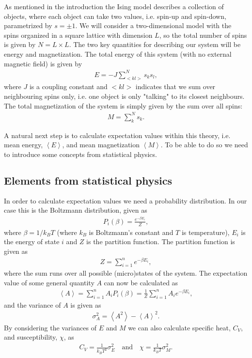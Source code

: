 \documentclass[12pt, a4paper]{article}
\begin{document}
As mentioned in the introduction the Ising model describes a collection of objects, where each object 
can take two values, i.e. spin-up and spin-down, parametrized by $s=\pm 1$. We will consider a 
two-dimensional model with the spins organized in a square lattice with dimension $L$, so the total 
number of spins is given by $N = L\times L$. The two key quantities for describing our system 
will be energy and magnetization. The total energy of this system (with no external magnetic field) 
is given by 
\begin{align}
E = -J\sum_{<kl>}^{N} s_k s_l, 
\end{align}
where $J$ is a coupling constant and $<kl>$ indicates that we sum over neighbouring spins only, i.e. 
one object is only "talking" to its closest neighbours. The total magnetization of the system is simply 
given by the sum over all spins: 
\begin{align} 
M = \sum_k^N s_k. 
\end{align}

A natural next step is to calculate expectation values within this theory, i.e. mean energy, 
$\left\langle E \right\rangle$, and mean magnetization $\left\langle M \right\rangle$. To be able to do 
so we need to introduce some concepts from statistical physics.  

\subsection{Elements from statistical physics}

In order to calculate expectation values we need a probability distribution. In our case this is the 
Boltzmann distribution, given as 
\begin{align*}
P_i(\beta) = \frac{e^{-\beta E_i}}{Z}, 
\end{align*}
where $\beta = 1/k_B T$ (where $k_B$ is Boltzmann's constant and $T$ is temperature), $E_i$ is the 
energy of state $i$ and $Z$ is the partition function. The partition function is given as 
\begin{align*}
Z = \sum_{i=1}^n e^{-\beta E_i}, 
\end{align*}
where the sum runs over all possible (micro)states of the system. The expectation value of some 
general quantity $A$ can now be calculated as 
\begin{align*}
\left\langle A \right\rangle = \sum_{i=1}^n A_i P_i(\beta) = \frac{1}{Z} \sum_{i=1}^n A_i e^{-\beta E_i}, 
\end{align*} 
and the variance of $A$ is given as 
\begin{align*}
\sigma_A^2 = \left\langle A^2 \right\rangle - \left\langle A \right\rangle^2. 
\end{align*}
By considering the variances of $E$ and $M$ we can also calculate specific heat, $C_V$, and 
susceptibility, $\chi$, as 
\begin{align*}
C_V = \frac{1}{k_BT^2}\sigma_E^2 \quad \text{and} \quad \chi = \frac{1}{k_B T}\sigma_M^2. 
\end{align*}
\end{document}
